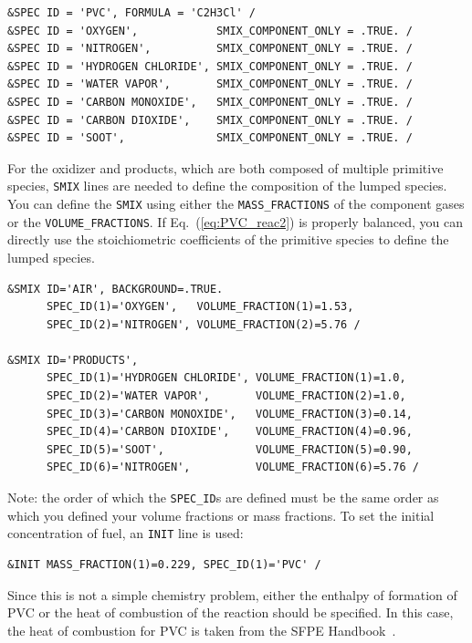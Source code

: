 \documentclass[11pt]{book}
\newcommand{\ct}{\tt\small}
\begin{document}
\footnotesize
\begin{verbatim}
&SPEC ID = 'PVC', FORMULA = 'C2H3Cl' /
&SPEC ID = 'OXYGEN',            SMIX_COMPONENT_ONLY = .TRUE. /
&SPEC ID = 'NITROGEN',          SMIX_COMPONENT_ONLY = .TRUE. /
&SPEC ID = 'HYDROGEN CHLORIDE', SMIX_COMPONENT_ONLY = .TRUE. /
&SPEC ID = 'WATER VAPOR',       SMIX_COMPONENT_ONLY = .TRUE. /
&SPEC ID = 'CARBON MONOXIDE',   SMIX_COMPONENT_ONLY = .TRUE. /
&SPEC ID = 'CARBON DIOXIDE',    SMIX_COMPONENT_ONLY = .TRUE. /
&SPEC ID = 'SOOT',              SMIX_COMPONENT_ONLY = .TRUE. /
\end{verbatim} \normalsize

\noindent For the oxidizer and products, which are both composed of multiple primitive species, {\ct SMIX} lines are needed to define the composition of the lumped species. You can define the {\ct SMIX} using either the {\ct MASS\_FRACTIONS} of the component gases or the {\ct VOLUME\_FRACTIONS}. If Eq.~(\ref{eq:PVC_reac2}) is properly balanced, you can directly use the stoichiometric coefficients of the primitive species to define the lumped species.

\footnotesize
\begin{verbatim}
&SMIX ID='AIR', BACKGROUND=.TRUE.
      SPEC_ID(1)='OXYGEN',   VOLUME_FRACTION(1)=1.53,
      SPEC_ID(2)='NITROGEN', VOLUME_FRACTION(2)=5.76 /

&SMIX ID='PRODUCTS',
      SPEC_ID(1)='HYDROGEN CHLORIDE', VOLUME_FRACTION(1)=1.0,
      SPEC_ID(2)='WATER VAPOR',       VOLUME_FRACTION(2)=1.0,
      SPEC_ID(3)='CARBON MONOXIDE',   VOLUME_FRACTION(3)=0.14,
      SPEC_ID(4)='CARBON DIOXIDE',    VOLUME_FRACTION(4)=0.96,
      SPEC_ID(5)='SOOT',              VOLUME_FRACTION(5)=0.90,
      SPEC_ID(6)='NITROGEN',          VOLUME_FRACTION(6)=5.76 /
\end{verbatim} \normalsize

\noindent
Note: the order of which the {\ct SPEC\_ID}s are defined must be the same order as which you defined your volume fractions or mass fractions. To set the initial concentration of fuel, an {\ct INIT} line is used:

\footnotesize
\begin{verbatim}
&INIT MASS_FRACTION(1)=0.229, SPEC_ID(1)='PVC' /
\end{verbatim} \normalsize

\noindent Since this is not a simple chemistry problem, either the enthalpy of formation of PVC or the heat of combustion of the reaction should be specified. In this case, the heat of combustion for PVC is taken from the SFPE Handbook~\cite{SFPE:Tewarson}.
\end{document}
